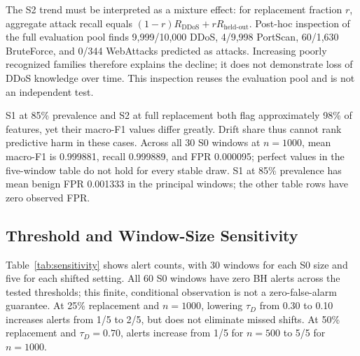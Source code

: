 \documentclass[runningheads]{llncs}
\begin{document}
The S2 trend must be interpreted as a mixture effect: for replacement fraction $r$, aggregate attack recall equals $(1-r)R_{\mathrm{DDoS}}+rR_{\mathrm{held\mbox{-}out}}$. Post-hoc inspection of the full evaluation pool finds 9,999/10,000 DDoS, 4/9,998 PortScan, 60/1,630 BruteForce, and 0/344 WebAttacks predicted as attacks. Increasing poorly recognized families therefore explains the decline; it does not demonstrate loss of DDoS knowledge over time. This inspection reuses the evaluation pool and is not an independent test.

S1 at 85\% prevalence and S2 at full replacement both flag approximately 98\% of features, yet their macro-F1 values differ greatly. Drift share thus cannot rank predictive harm in these cases. Across all 30 S0 windows at $n=1000$, mean macro-F1 is 0.999881, recall 0.999889, and FPR 0.000095; perfect values in the five-window table do not hold for every stable draw. S1 at 85\% prevalence has mean benign FPR 0.001333 in the principal windows; the other table rows have zero observed FPR.

\subsection{Threshold and Window-Size Sensitivity}
Table~\ref{tab:sensitivity} shows alert counts, with 30 windows for each S0 size and five for each shifted setting. All 60 S0 windows have zero BH alerts across the tested thresholds; this finite, conditional observation is not a zero-false-alarm guarantee. At 25\% replacement and $n=1000$, lowering $\tau_D$ from 0.30 to 0.10 increases alerts from 1/5 to 2/5, but does not eliminate missed shifts. At 50\% replacement and $\tau_D=0.70$, alerts increase from 1/5 for $n=500$ to 5/5 for $n=1000$.
\end{document}
